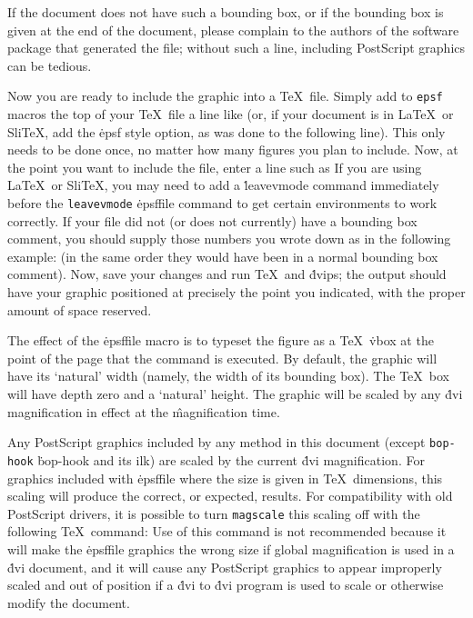 If the document does not have such a bounding box, or if the bounding box
is given at the end of the document, please complain to the authors of the
software package that generated the file; without such a line, including
PostScript graphics can be tedious.


Now you are ready to include the graphic into a \TeX\ file.  Simply add to
\^{{\tt epsf} macros}
the top of your \TeX\ file a line like
\noindent
(or, if your document is in La\TeX\ or Sli\TeX, add the \.{epsf} style
option, as was done to the following line).
\noindent
This only needs to be done once, no matter how many figures you plan to
include.  Now, at the point you want to include the file, enter a line
such as
\noindent
If you are using La\TeX\ or Sli\TeX, you may need to add a
\.{\ttbackslash leavevmode} command immediately before the
\^{{\tt leavevmode}}
\.{\ttbackslash epsffile} command to get certain environments to work
correctly.  If your file did not (or does not currently) have a bounding
box comment, you should supply those numbers you wrote down as in the
following example:
\noindent
(in the same order they would have been in a normal bounding box comment).
Now, save your changes and run \TeX\ and \.{dvips}; the output should
have your graphic positioned at precisely the point you indicated, with the
proper amount of space reserved.

The effect of the \.{\ttbackslash epsffile} macro is to typeset the figure
as a \TeX\ \.{\ttbackslash vbox} at the point of the page that the command
is executed.  By default, the graphic will have its
`natural' width (namely, the width of its bounding box).
The \TeX\ box will have depth zero and a `natural' height.
The graphic will be scaled by any \.{dvi} magnification in effect at the
\^{magnification}
time.

Any PostScript graphics included by any method in this document (except
\^{{\tt bop-hook}}
\.{bop-hook} and its ilk) are scaled by the current \.{dvi} magnification.
For graphics included with \.{\ttbackslash epsffile} where the size is given
in \TeX\
dimensions, this scaling will produce the correct, or expected, results.
For compatibility with old PostScript drivers, it is possible to turn
\^{{\tt magscale}}
this scaling off with the following \TeX\ command:
\noindent
Use of this command is not recommended because it will make the
\.{\ttbackslash epsffile} graphics the wrong size if global
magnification is used
in a \.{dvi} document, and it will cause any PostScript graphics to
appear improperly scaled and out of position if a \.{dvi} to \.{dvi}
program is used to scale or otherwise modify the document.

